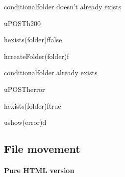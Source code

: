 \documentclass[a4paper, dvipsnames]{article}
\begin{document}
	\begin{center}
		\begin{sequencediagram}
			
			\begin{sdblock}{conditional}{folder doesn't already exists}
				\begin{call}{u}{POST}{h}{200}
					\begin{call}{h}{exists(folder)}{f}{false}
					\end{call}
					\begin{call}{h}{createFolder(folder)}{f}{}
					\end{call}
				\end{call}
			\end{sdblock}
			\begin{sdblock}{conditional}{folder already exists}
				\begin{call}{u}{POST}{h}{error}
					\begin{call}{h}{exists(folder)}{f}{true}
					\end{call}
				\end{call}
				\begin{call}{u}{show(error)}{d}{}
				\end{call}
			\end{sdblock}
		\end{sequencediagram}
	\end{center}
	
	\pagebreak
	
	\subsection{File movement}
	
	\paragraph{Pure HTML version}
	
\end{document}
